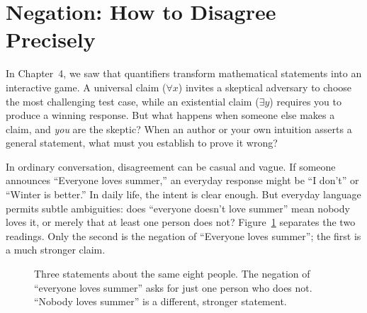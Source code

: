 \section{Negation: How to Disagree Precisely}
\chapterline

In Chapter~4, we saw that quantifiers transform mathematical statements into an interactive game. A universal claim ($\forall x$) invites a skeptical adversary to choose the most challenging test case, while an existential claim ($\exists y$) requires you to produce a winning response. But what happens when someone else makes a claim, and \emph{you} are the skeptic? When an author or your own intuition asserts a general statement, what must you establish to prove it wrong?

In ordinary conversation, disagreement can be casual and vague. If someone announces ``Everyone loves summer,'' an everyday response might be ``I don't'' or ``Winter is better.'' In daily life, the intent is clear enough. But everyday language permits subtle ambiguities: does ``everyone doesn't love summer'' mean nobody loves it, or merely that at least one person does not? Figure~\ref{05:fig-summer} separates the two readings. Only the second is the negation of ``Everyone loves summer''; the first is a much stronger claim.

\begin{figure}[htbp]
\centering
{}
\caption{Three statements about the same eight people. The negation of ``everyone loves summer'' asks for just one person who does not. ``Nobody loves summer'' is a different, stronger statement.}
\label{05:fig-summer}
\end{figure}

